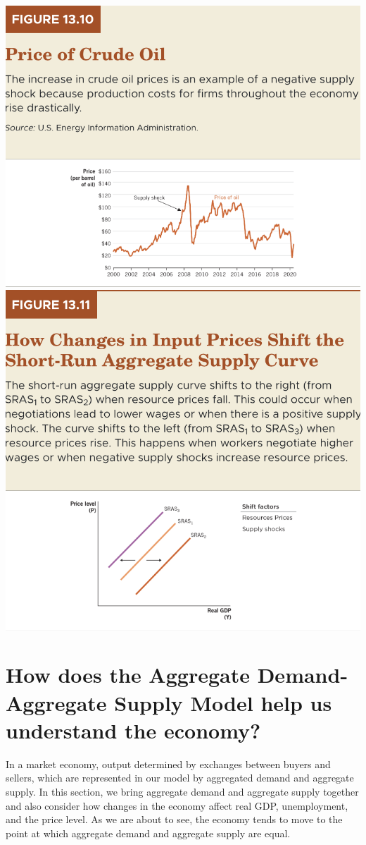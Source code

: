 \documentclass[11pt]{article} %
\begin{document}
\begin{center}
\includegraphics[scale=0.5]{images/Figure 13.10.png}
\includegraphics[scale=0.5]{images/Figure 13.11.png} 
\end{center}

\section*{\textbf{How does the Aggregate Demand-Aggregate Supply Model help us understand the economy?}}
In a market economy, output determined by exchanges between buyers and sellers, which are represented in our model by aggregated demand and aggregate supply. In this section, we bring aggregate demand and aggregate supply together and also consider how changes in the economy affect real GDP, unemployment, and the price level. As we are about to see, the economy tends to move to the point at which aggregate demand and aggregate supply are equal.
\end{document}
